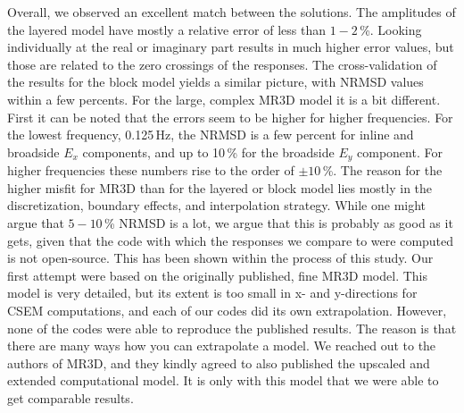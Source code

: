 \documentclass[
    paper,
  ]{geophysics}
\begin{document}
Overall, we observed an excellent match between the solutions. The amplitudes of the layered model have mostly a relative error of less than $1-2\,$\%. Looking individually at the real or imaginary part results in much higher error values, but those are related to the zero crossings of the responses. The cross-validation of the results for the block model yields a similar picture, with NRMSD values within a few percents. For the large, complex MR3D model it is a bit different. First it can be noted that the errors seem to be higher for higher frequencies. For the lowest frequency, 0.125\,Hz, the NRMSD is a few percent for inline and broadside $E_x$ components, and up to 10\,\% for the broadside $E_y$ component. For higher frequencies these numbers rise to the order of $\pm10\,$\%. The reason for the higher misfit for MR3D than for the layered or block model lies mostly in the discretization, boundary effects, and interpolation strategy. While one might argue that $5-10\,$\% NRMSD is a lot, we argue that this is probably as good as it gets, given that the code with which the responses we compare to were computed is not open-source. This has been shown within the process of this study. Our first attempt were based on the originally published, fine MR3D model. This model is very detailed, but its extent is too small in x- and y-directions for CSEM computations, and each of our codes did its own extrapolation. However, none of the codes were able to reproduce the published results. The reason is that there are many ways how you can extrapolate a model. We reached out to the authors of MR3D, and they kindly agreed to also published the upscaled and extended computational model. It is only with this model that we were able to get comparable results.
\end{document}
